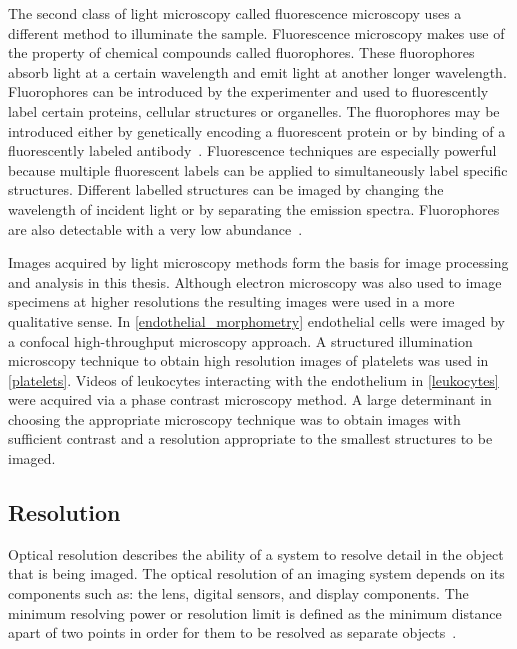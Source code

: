 The second class of light microscopy called fluorescence microscopy uses a different method to illuminate the sample. Fluorescence microscopy makes use of the property of chemical compounds called fluorophores. These fluorophores absorb light at a certain wavelength and emit light at another longer wavelength. Fluorophores can be introduced by the experimenter and used to fluorescently label certain proteins, cellular structures or organelles. The fluorophores may be introduced either by genetically encoding a fluorescent protein or by binding of a fluorescently labeled antibody~\cite{Thorn2016}. Fluorescence techniques are especially powerful because multiple fluorescent labels can be applied to simultaneously label specific structures. Different labelled structures can be imaged by changing the wavelength of incident light or by separating the emission spectra. Fluorophores are also detectable with a very low abundance~\cite{Ljosa2009}.

Images acquired by light microscopy methods form the basis for image processing and analysis in this thesis. Although electron microscopy was also used to image specimens at higher resolutions the resulting images were used in a more qualitative sense. In \autoref{endothelial_morphometry} endothelial cells were imaged by a confocal high-throughput microscopy approach. A structured illumination microscopy technique to obtain high resolution images of platelets was used in \autoref{platelets}. Videos of leukocytes interacting with the endothelium in \autoref{leukocytes} were acquired via a phase contrast microscopy method. A large determinant in choosing the appropriate microscopy technique was to obtain images with sufficient contrast and a resolution appropriate to the smallest structures to be imaged.

\subsection{Resolution}
\label{introduction:microscopy:resolution}
Optical resolution describes the ability of a system to resolve detail in the object that is being imaged. The optical resolution of an imaging system depends on its components such as: the lens, digital sensors, and display components. The minimum resolving power or resolution limit is defined as the minimum distance apart of two points in order for them to be resolved as separate objects~\cite{Abbe1873}. 

